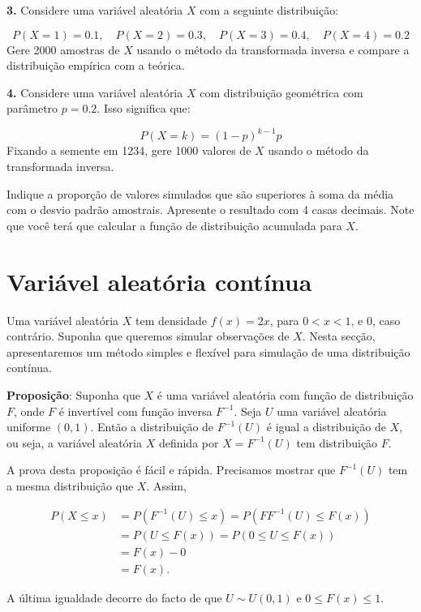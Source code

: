 \documentclass[
]{book}
\begin{document}
\textbf{3.} Considere uma variável aleatória \(X\) com a seguinte distribuição:

\[P(X = 1) = 0.1, \quad P(X = 2) = 0.3, \quad P(X = 3) = 0.4, \quad P(X = 4) = 0.2\]
Gere 2000 amostras de \(X\) usando o método da transformada inversa e
compare a distribuição empírica com a teórica.

\textbf{4.} Considere uma variável aleatória \(X\) com distribuição geométrica
com parâmetro \(p = 0.2\). Isso significa que:

\[P(X = k) = (1 - p)^{k-1}p\]
Fixando a semente em 1234, gere 1000 valores de \(X\) usando o método da transformada inversa.

Indique a proporção de valores simulados que são superiores à soma da média com o desvio padrão amostrais. Apresente o resultado com 4 casas decimais. Note que você terá que calcular a função de distribuição acumulada para \(X\).

\section{Variável aleatória contínua}\label{variuxe1vel-aleatuxf3ria-contuxednua}

Uma variável aleatória \(X\) tem densidade \(f(x)=2x\), para \(0<x<1\), e 0,
caso contrário. Suponha que queremos simular observações de \(X\). Nesta
secção, apresentaremos um método simples e flexível para simulação de
uma distribuição contínua.

\textbf{Proposição}: Suponha que \(X\) é uma variável aleatória com função de
distribuição \(F\), onde \(F\) é invertível com função inversa \(F^{-1}\).
Seja \(U\) uma variável aleatória uniforme \((0,1)\). Então a distribuição
de \(F^{-1}(U)\) é igual a distribuição de \(X\), ou seja, a variável
aleatória \(X\) definida por \(X=F^{-1}(U)\) tem distribuição \(F\).

A prova desta proposição é fácil e rápida. Precisamos mostrar que
\(F^{-1}(U)\) tem a mesma distribuição que \(X\). Assim,

\begin{align*}
P(X \leq x) &= P(F^{-1}(U)\leq x) = P(FF^{-1}(U) \leq F(x)) \\
&= P(U \leq F(x)) = P(0\leq U \leq F(x)) \\
&= F(x)-0 \\
&= F(x).
\end{align*}

A última igualdade decorre do facto de que \(U\sim U(0,1)\) e
\(0\leq F(x) \leq 1\).
\end{document}
